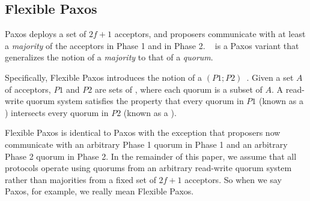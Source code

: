 \subsection{Flexible Paxos}
Paxos deploys a set of $2f+1$ acceptors, and proposers communicate with at
least a \emph{majority} of the acceptors in Phase 1 and in Phase 2.
~\cite{howard2017flexible} is a Paxos variant that
generalizes the notion of a \emph{majority} to that of a \emph{quorum}.

Specifically, Flexible Paxos introduces the notion of a  $(P1; P2)$~\cite{vukolic2013origin}. Given a set $A$ of
acceptors, $P1$ and $P2$ are sets of , where each quorum is a
subset of $A$. A read-write quorum system satisfies the property that every
quorum in $P1$ (known as a ) intersects every quorum in
$P2$ (known as a ).

Flexible Paxos is identical to Paxos with the exception that proposers now
communicate with an arbitrary Phase 1 quorum in Phase 1 and an arbitrary Phase
2 quorum in Phase 2. In the remainder of this paper, we assume that all
protocols operate using quorums from an arbitrary read-write quorum system
rather than majorities from a fixed set of $2f+1$ acceptors. So when we say
Paxos, for example, we really mean Flexible Paxos.

%


